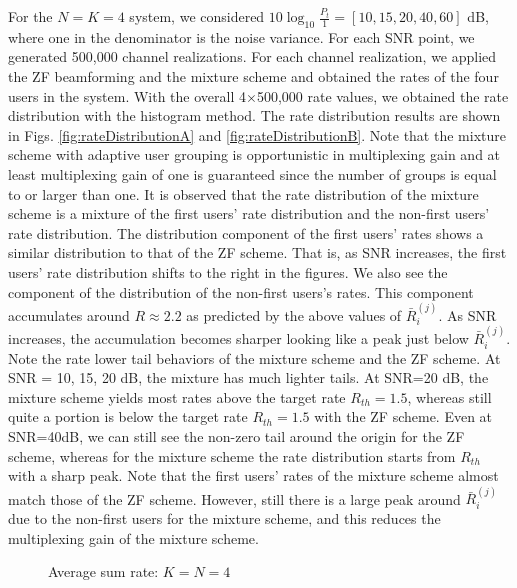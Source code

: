 \documentclass[11pt, draft, onecolumn ]{IEEEtran}
\def\scalefig#1{\epsfxsize #1\textwidth}
\begin{document}
For the $N=K=4$ system, we considered $10\log_{10}\frac{P_t}{1}=[10,15,20,40,60]$ dB, where one in the denominator is the noise variance. For each SNR point, we generated 500,000 channel realizations. For each channel realization, we applied the ZF beamforming and the mixture scheme and obtained the rates of the four users in the system. With the overall 4$\times$500,000 rate values, we obtained the rate distribution with the histogram method. The rate distribution results are shown in Figs. \ref{fig:rateDistributionA} and \ref{fig:rateDistributionB}.  Note that the mixture scheme with adaptive user grouping is opportunistic in  multiplexing gain and at least multiplexing gain of one is guaranteed since the number of groups is equal to or larger than one. It is observed that the rate distribution of the mixture scheme is a mixture of the first users' rate distribution and the non-first users' rate distribution. The distribution component of the first users' rates shows a similar distribution to that of the ZF scheme. That is, as SNR increases, the first users' rate distribution shifts to the right in the figures. We also see the component of the distribution of the non-first  users's rates. This component accumulates around $R\approx 2.2$ as predicted by the above values of $\bar{R}_i^{(j)}$. As SNR increases, the accumulation becomes sharper looking like a peak just below $\bar{R}_i^{(j)}$. Note the rate lower tail behaviors of the mixture scheme and the ZF scheme. At SNR = 10, 15, 20 dB, the mixture has much lighter tails. At SNR=20 dB, the mixture scheme yields most rates above the target rate $R_{th}=1.5$, whereas still quite a portion is below the target rate $R_{th}=1.5$ with the ZF scheme. Even at SNR=40dB, we can still see the non-zero tail around the origin for the ZF scheme, whereas for the mixture scheme the rate distribution starts from $R_{th}$ with a sharp peak. Note that the first users' rates of the mixture scheme almost match those of the ZF scheme. However, still there is a large peak around $\bar{R}_{i}^{(j)}$ due to the non-first users for the mixture scheme, and this reduces the multiplexing gain of the mixture scheme.

\begin{figure}[ht]
\begin{psfrags}
    \centerline{ \scalefig{0.6}  }
    \caption{Average sum rate: $K=N=4$}
    \label{fig:sum_rate_multiplexingGain}
\end{psfrags}
\end{figure}
\end{document}

